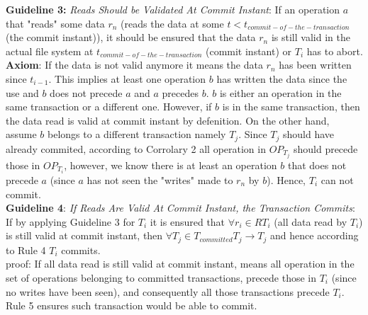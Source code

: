 \documentclass[a4paper, 11pt]{article}
\begin{document}
\textbf{Guideline 3:} \emph{Reads Should be Validated At Commit Instant}:
If an operation $a$ that "reads" some data $r_n$ (reads the data at some $t < t_{commit-of-the-transaction}$(the commit instant)), it should be ensured that the data $r_n$ is still valid in the actual file system at $t_{commit-of-the-transaction}$ (commit instant) or $T_i$ has to abort.\\

\textbf{Axiom}: If the data is not valid anymore it means the data $r_n$ has been written since $t_{i-1}$. This implies at least one operation $b$ has written the data since the use and $b$ does not precede $a$ and $a$ precedes $b$. $b$ is either an operation in the same transaction or a different one. However, if $b$ is in the same transaction, then the data read is valid at commit instant by defenition. On the other hand, assume $b$ belongs to a different transaction namely $T_j$. Since $T_j$ should have already commited, according to Corrolary 2 all operation in $OP_{T_j}$ should precede those in $OP_{T_i}$, however, we know there is at least an operation $b$ that does not precede $a$ (since $a$ has not seen the "writes" made to $r_n$ by $b$). Hence, $T_i$ can not commit.\\


\textbf{Guideline 4}: \emph{If Reads Are Valid At Commit Instant, the Transaction Commits}: If by applying Guideline 3 for $T_i$ it is ensured that $\forall r_i \in R{T_i}$ (all data read by $T_i$) is still valid at commit instant, then $\forall T_j \in T_{committed} T_j \rightarrow T_j$ and hence according to Rule 4 $T_i$ commits.\\

proof: If all data read is still valid at commit instant, means all operation in the set of operations belonging to committed transactions, precede those in $T_i$ (since no writes have been seen), and consequently all those transactions precede $T_i$. Rule 5 ensures such transaction would be able to commit.\\ 
\end{document}
